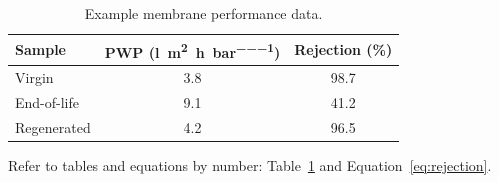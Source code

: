 \begin{table}[htbp]
  \centering
  \caption{Example membrane performance data.}
  \label{tab:performance}
  \begin{tabular}{lcc}
    \toprule
    Sample & PWP (\si{\litre\per\square\metre\per\hour\per\bar}) & Rejection (\%) \\
    \midrule
    Virgin       & 3.8 & 98.7 \\
    End-of-life   & 9.1 & 41.2 \\
    Regenerated  & 4.2 & 96.5 \\
    \bottomrule
  \end{tabular}
\end{table}

Refer to tables and equations by number: Table~\ref{tab:performance} and Equation~\eqref{eq:rejection}.
